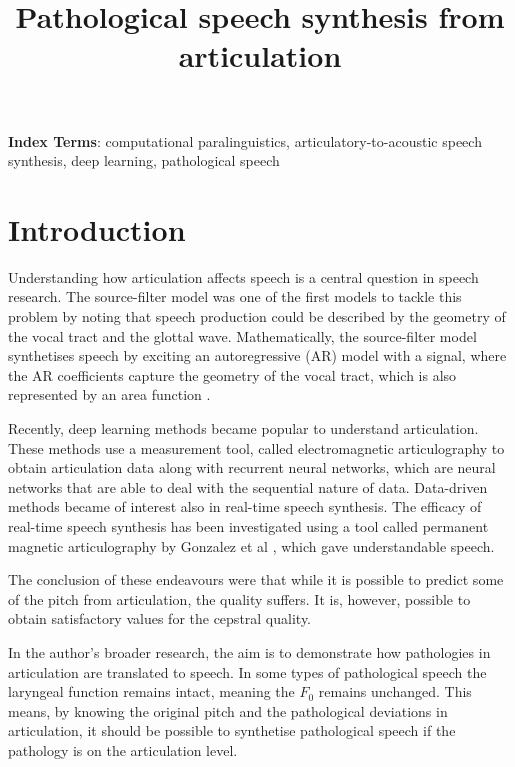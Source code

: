 \documentclass[a4paper]{article}
\title{Pathological speech synthesis from articulation}
\begin{document}
\maketitle
% 
\begin{abstract}
  \blindtext[1]
\end{abstract}
\noindent\textbf{Index Terms}: computational paralinguistics, articulatory-to-acoustic
speech synthesis, deep learning, pathological speech

\section{Introduction}

Understanding how articulation affects speech is a central question in speech
research. The source-filter model was one of the first models to tackle this
problem by noting that speech production could be described by
the geometry of the vocal tract and the glottal wave. Mathematically,
the source-filter model synthetises speech by exciting an autoregressive (AR) model with a
signal, where the AR coefficients capture the geometry of the
vocal tract, which is also represented by an area function \cite{Benesty2009}. 

Recently, deep learning methods became popular
to understand articulation. These methods use a measurement tool,
called electromagnetic articulography to obtain articulation data 
\cite{Aryal2016} \cite{Taguchi} \cite{Liu2018} along with recurrent
neural networks, which are neural networks that are able to deal with
the sequential nature of data. Data-driven methods became of interest also
in real-time speech synthesis. The efficacy of real-time speech synthesis
has been investigated using a tool called permanent magnetic articulography
by Gonzalez et al \cite{Gonzalez2017}, which gave understandable
speech.

The conclusion of these endeavours were that while it is possible to
predict some of the pitch from articulation, the quality suffers.
It is, however, possible to obtain satisfactory values for the
cepstral quality.

In the author's broader research, the aim is to demonstrate how pathologies in
articulation are translated to speech. In some types of pathological
speech the laryngeal function remains intact, meaning the \( F_0 \)
remains unchanged. This means, by knowing the original pitch and the
pathological deviations in articulation, it should be possible to
synthetise pathological speech if the pathology is on the articulation level.
\end{document}
